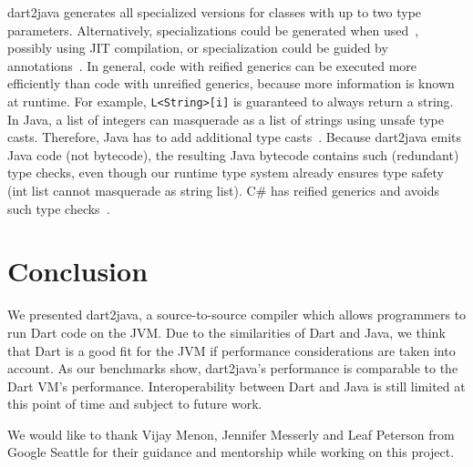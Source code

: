 \documentclass[sigplan]{acmart}
\begin{document}
dart2java generates all specialized versions for classes with up to two type parameters. Alternatively, specializations could be generated when used~\cite{Kennedy:2001:DIG:378795.378797}, possibly using JIT compilation, or specialization could be guided by annotations~\cite{Dragos:2009:CGT:1565824.1565830}. In general, code with reified generics can be executed more efficiently than code with unreified generics, because more information is known at runtime. For example, \texttt{L<String>[i]} is guaranteed to always return a string. In Java, a list of integers can masquerade as a list of strings using unsafe type casts. Therefore, Java has to add additional type casts~\cite{Nino:2007:CEJ:1229688.1229690, BrachaJuly52004}. Because dart2java emits Java code (not bytecode), the resulting Java bytecode contains such (redundant) type checks, even though our runtime type system already ensures type safety (int list cannot masquerade as string list). C\# has reified generics and avoids such type checks~\cite{Kennedy:2001:DIG:378795.378797}.


\section{Conclusion}
We presented dart2java, a source-to-source compiler which allows programmers to run Dart code on the JVM.  Due to the similarities of Dart and Java, we think that Dart is a good fit for the JVM if performance considerations are taken into account. As our benchmarks show, dart2java's performance is comparable to the Dart VM's performance. Interoperability between Dart and Java is still limited at this point of time and subject to future work.

\begin{acks} 
We would like to thank Vijay Menon, Jennifer Messerly and Leaf Peterson from Google Seattle for their guidance and mentorship while working on this project. 
\end{acks}






\appendix
\end{document}
